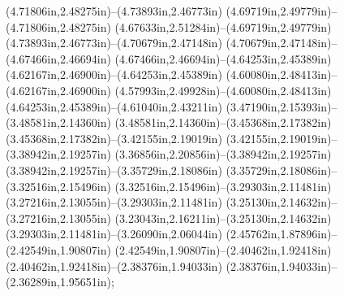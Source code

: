 (4.71806in,2.48275in)--(4.73893in,2.46773in) (4.69719in,2.49779in)--(4.71806in,2.48275in) (4.67633in,2.51284in)--(4.69719in,2.49779in) (4.73893in,2.46773in)--(4.70679in,2.47148in) (4.70679in,2.47148in)--(4.67466in,2.46694in) (4.67466in,2.46694in)--(4.64253in,2.45389in) (4.62167in,2.46900in)--(4.64253in,2.45389in) (4.60080in,2.48413in)--(4.62167in,2.46900in) (4.57993in,2.49928in)--(4.60080in,2.48413in) (4.64253in,2.45389in)--(4.61040in,2.43211in) (3.47190in,2.15393in)--(3.48581in,2.14360in) (3.48581in,2.14360in)--(3.45368in,2.17382in) (3.45368in,2.17382in)--(3.42155in,2.19019in) (3.42155in,2.19019in)--(3.38942in,2.19257in) (3.36856in,2.20856in)--(3.38942in,2.19257in) (3.38942in,2.19257in)--(3.35729in,2.18086in) (3.35729in,2.18086in)--(3.32516in,2.15496in) (3.32516in,2.15496in)--(3.29303in,2.11481in) (3.27216in,2.13055in)--(3.29303in,2.11481in) (3.25130in,2.14632in)--(3.27216in,2.13055in) (3.23043in,2.16211in)--(3.25130in,2.14632in) (3.29303in,2.11481in)--(3.26090in,2.06044in) (2.45762in,1.87896in)--(2.42549in,1.90807in) (2.42549in,1.90807in)--(2.40462in,1.92418in) (2.40462in,1.92418in)--(2.38376in,1.94033in) (2.38376in,1.94033in)--(2.36289in,1.95651in);
